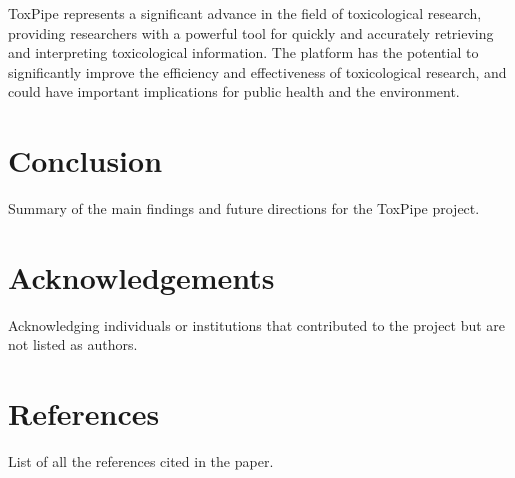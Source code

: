\documentclass[
  super,
  preprint,
  5p,
  twocolumn]{elsarticle}
\begin{document}
ToxPipe represents a significant advance in the field of toxicological
research, providing researchers with a powerful tool for quickly and
accurately retrieving and interpreting toxicological information. The
platform has the potential to significantly improve the efficiency and
effectiveness of toxicological research, and could have important
implications for public health and the environment.

\hypertarget{conclusion}{%
\section{Conclusion}\label{conclusion}}

Summary of the main findings and future directions for the ToxPipe
project.

\hypertarget{acknowledgements}{%
\section{Acknowledgements}\label{acknowledgements}}

Acknowledging individuals or institutions that contributed to the
project but are not listed as authors.

\hypertarget{references}{%
\section{References}\label{references}}

List of all the references cited in the paper.


  
\end{document}
